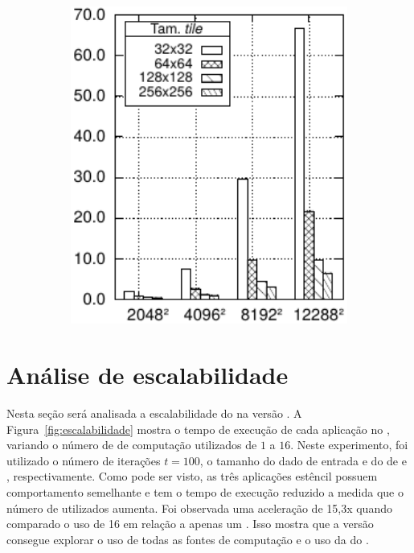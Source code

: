 \begin{figure}
\begin{subfigure}{0.3\textwidth}
    \caption{\gol}
    \label{fig:tilesGol}
  \end{subfigure}
  \begin{subfigure}{0.3\textwidth}
    \centering
    \includegraphics[width=1\textwidth]{figs/MPPAPlotAPIjacobiTimeTiles.pdf}
    \caption{\jacobi}
    \label{fig:tilesJacobi}
  \end{subfigure}
  \label{fig:tiles}
\end{figure}


\section{Análise de escalabilidade}
\label{sec:analise_escalabilidade}

Nesta seção será analisada a escalabilidade do \pskelmppa na versão \async. A Figura~\ref{fig:escalabilidade} mostra o tempo de execução de cada aplicação no \mppa, variando o número de \clusters de computação utilizados de $1$ a $16$. Neste experimento, foi utilizado o número de iterações $t=100$, o tamanho do dado de entrada e do \tile de \ind e \tiled, respectivamente. Como pode ser visto, as três aplicações estêncil possuem comportamento semelhante e tem o tempo de execução reduzido a medida que o número de \clusters utilizados aumenta. Foi observada uma aceleração de 15,3x quando comparado o uso de 16 \clusters em relação a apenas um \cluster. Isso mostra que a versão \pskelmppa \async consegue explorar o uso de todas as fontes de computação e o uso da \noc do \mppa.

